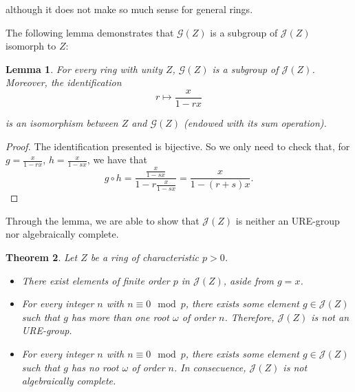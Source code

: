 \documentclass[preprint,12pt]{elsarticle}
\newtheorem{thm}{Theorem}
\newtheorem{lemm}[thm]{Lemma}
\begin{document}
\noindent although it does not make so much sense for general rings.

The following lemma demonstrates that $\mathcal G(Z)$ is a subgroup of $\mathcal J(Z)$ isomorph to $Z$: 

\begin{lemm} For every ring with unity $Z$, $\mathcal G(Z)$ is a subgroup of $\mathcal J(Z)$. Moreover, the identification
$$r\longmapsto\frac{x}{1-rx}$$


\noindent is an isomorphism between $Z$ and $\mathcal G(Z)$   (endowed with its sum operation).
\end{lemm}

\begin{proof} The identification presented is bijective. So we only need to check that, for $g=\frac{x}{1-rx}$, $h=\frac{x}{1-sx}$, we have that
$$g\circ h=\frac{\frac{x}{1-sx}}{1-r\frac{x}{1-sx}}=\frac{x}{1-(r+s)x}.$$
$ $ \end{proof}


Through the lemma, we are able to show that $\mathcal J(Z)$ is neither an URE-group nor algebraically complete.

\begin{thm} Let $Z$ be a ring of characteristic $p>0$.

\begin{itemize}


\item[(a)]  There exist elements of  finite order $p$ in $\mathcal J(Z)$, aside from $g=x$.



\item[(b)] For every integer $n$ with $n\equiv 0\mod p$, there exists some element $g\in\mathcal J(Z)$ such that $g$ has more than one root $\omega$ of order $n$. Therefore, $\mathcal J(Z)$ is not an URE-group.


\item[(c)] For every integer $n$ with $n\equiv 0\mod p$, there exists some element $g\in \mathcal J(Z)$ such that $g$ has no root $\omega$ of order $n$. In consecuence, $\mathcal J(Z)$ is not algebraically complete.


\end{itemize}




\end{thm}
\end{document}
